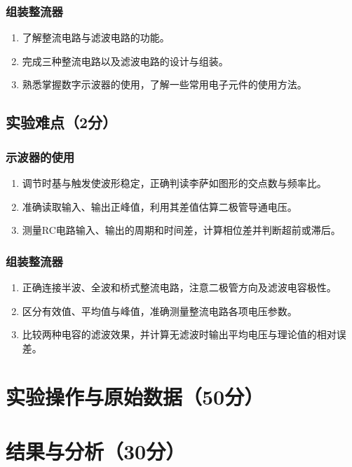 \documentclass[10pt,a4paper]{ctexart} %
\begin{document}
    \subsubsection{组装整流器}
    \begin{enumerate}
      \item 了解整流电路与滤波电路的功能。
      \item 完成三种整流电路以及滤波电路的设计与组装。
      \item 熟悉掌握数字示波器的使用，了解一些常用电子元件的使用方法。
    \end{enumerate}

  \subsection{实验难点（2分）}

    \subsubsection{示波器的使用}
    \begin{enumerate}
      \item 调节时基与触发使波形稳定，正确判读李萨如图形的交点数与频率比。
      \item 准确读取输入、输出正峰值，利用其差值估算二极管导通电压。
      \item 测量RC电路输入、输出的周期和时间差，计算相位差并判断超前或滞后。
    \end{enumerate}

    \subsubsection{组装整流器}
    \begin{enumerate}
      \item 正确连接半波、全波和桥式整流电路，注意二极管方向及滤波电容极性。
      \item 区分有效值、平均值与峰值，准确测量整流电路各项电压参数。
      \item 比较两种电容的滤波效果，并计算无滤波时输出平均电压与理论值的相对误差。
    \end{enumerate}

\section{实验操作与原始数据（50分）}

\section{结果与分析（30分）}
\end{document}
